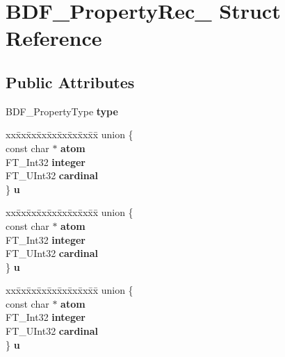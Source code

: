 \hypertarget{structBDF__PropertyRec__}{}\section{B\+D\+F\+\_\+\+Property\+Rec\+\_\+ Struct Reference}
\label{structBDF__PropertyRec__}
\subsection*{Public Attributes}
\begin{DoxyCompactItemize}
\item 
\mbox{\label{structBDF__PropertyRec___a88c19ee6f16bd1b36127f5f7d44a4e39}} 
B\+D\+F\+\_\+\+Property\+Type {\bfseries type}
\item 
\mbox{\label{structBDF__PropertyRec___ade85afee4631bc38ac4bdf244a845645}} 
\begin{tabbing}
xx\=xx\=xx\=xx\=xx\=xx\=xx\=xx\=xx\=\kill
union \{\\
\>const char $\ast$ {\bfseries atom}\\
\>FT\_Int32 {\bfseries integer}\\
\>FT\_UInt32 {\bfseries cardinal}\\
\} {\bfseries u}\\

\end{tabbing}\item 
\mbox{\label{structBDF__PropertyRec___acebbe4fc30f38e6ced19abc44c02c92c}} 
\begin{tabbing}
xx\=xx\=xx\=xx\=xx\=xx\=xx\=xx\=xx\=\kill
union \{\\
\>const char $\ast$ {\bfseries atom}\\
\>FT\_Int32 {\bfseries integer}\\
\>FT\_UInt32 {\bfseries cardinal}\\
\} {\bfseries u}\\

\end{tabbing}\item 
\mbox{\label{structBDF__PropertyRec___aa234a353c54d2986ad7b35596a593c0d}} 
\begin{tabbing}
xx\=xx\=xx\=xx\=xx\=xx\=xx\=xx\=xx\=\kill
union \{\\
\>const char $\ast$ {\bfseries atom}\\
\>FT\_Int32 {\bfseries integer}\\
\>FT\_UInt32 {\bfseries cardinal}\\
\} {\bfseries u}\\


\end{tabbing}
\end{DoxyCompactItemize}
